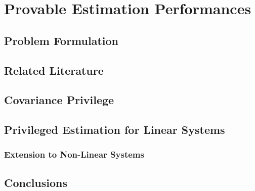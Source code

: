 
\chapter{Provable Estimation Performances}
\section{Problem Formulation}
\section{Related Literature}
\section{Covariance Privilege}
\section{Privileged Estimation for Linear Systems}
\subsection{Extension to Non-Linear Systems}
\section{Conclusions}
